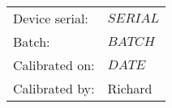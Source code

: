 \documentclass[8pt]{letter}
\begin{document}
\pagestyle{empty}
\vspace{5px}
\begin{center}
\begin{tabular}{ll}
Device serial: & \textbf{$SERIAL$}\\
Batch: & $BATCH$\\
Calibrated on: & $DATE$\\
Calibrated by: & Richard
\end{tabular}
\end{center}
\end{document}
